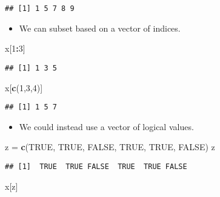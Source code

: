 \documentclass[]{book}
\newenvironment{Shaded}{\begin{snugshade}}{\end{snugshade}}
\newcommand{\DecValTok}[1]{\textcolor[rgb]{0.00,0.00,0.81}{#1}}
\newcommand{\KeywordTok}[1]{\textcolor[rgb]{0.13,0.29,0.53}{\textbf{#1}}}
\newcommand{\NormalTok}[1]{#1}
\newcommand{\OperatorTok}[1]{\textcolor[rgb]{0.81,0.36,0.00}{\textbf{#1}}}
\newcommand{\OtherTok}[1]{\textcolor[rgb]{0.56,0.35,0.01}{#1}}
\newcommand{\StringTok}[1]{\textcolor[rgb]{0.31,0.60,0.02}{#1}}
\providecommand{\tightlist}{%
  \setlength{\itemsep}{0pt}\setlength{\parskip}{0pt}}
\begin{document}
\begin{verbatim}
## [1] 1 5 7 8 9
\end{verbatim}

\begin{itemize}
\tightlist
\item
  We can subset based on a vector of indices.
\end{itemize}

\begin{Shaded}
\begin{Highlighting}[]
\NormalTok{x[}\DecValTok{1}\OperatorTok{:}\DecValTok{3}\NormalTok{]}
\end{Highlighting}
\end{Shaded}

\begin{verbatim}
## [1] 1 3 5
\end{verbatim}

\begin{Shaded}
\begin{Highlighting}[]
\NormalTok{x[}\KeywordTok{c}\NormalTok{(}\DecValTok{1}\NormalTok{,}\DecValTok{3}\NormalTok{,}\DecValTok{4}\NormalTok{)]}
\end{Highlighting}
\end{Shaded}

\begin{verbatim}
## [1] 1 5 7
\end{verbatim}

\begin{itemize}
\tightlist
\item
  We could instead use a vector of logical values.
\end{itemize}

\begin{Shaded}
\begin{Highlighting}[]
\NormalTok{z =}\StringTok{ }\KeywordTok{c}\NormalTok{(}\OtherTok{TRUE}\NormalTok{, }\OtherTok{TRUE}\NormalTok{, }\OtherTok{FALSE}\NormalTok{, }\OtherTok{TRUE}\NormalTok{, }\OtherTok{TRUE}\NormalTok{, }\OtherTok{FALSE}\NormalTok{)}
\NormalTok{z}
\end{Highlighting}
\end{Shaded}

\begin{verbatim}
## [1]  TRUE  TRUE FALSE  TRUE  TRUE FALSE
\end{verbatim}

\begin{Shaded}
\begin{Highlighting}[]
\NormalTok{x[z]}
\end{Highlighting}
\end{Shaded}
\end{document}
